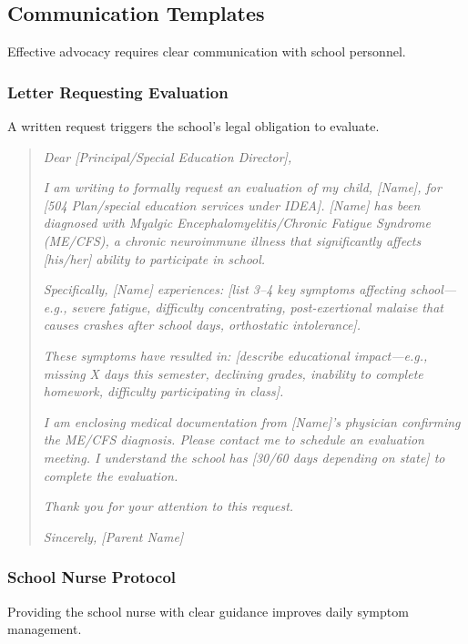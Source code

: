 \subsection{Communication Templates}
\label{subsec:school-communication}

Effective advocacy requires clear communication with school personnel.

\subsubsection{Letter Requesting Evaluation}

A written request triggers the school's legal obligation to evaluate.

\begin{quote}
\textit{Dear [Principal/Special Education Director],}

\textit{I am writing to formally request an evaluation of my child, [Name], for [504 Plan/special education services under IDEA]. [Name] has been diagnosed with Myalgic Encephalomyelitis/Chronic Fatigue Syndrome (ME/CFS), a chronic neuroimmune illness that significantly affects [his/her] ability to participate in school.}

\textit{Specifically, [Name] experiences: [list 3--4 key symptoms affecting school---e.g., severe fatigue, difficulty concentrating, post-exertional malaise that causes crashes after school days, orthostatic intolerance].}

\textit{These symptoms have resulted in: [describe educational impact---e.g., missing X days this semester, declining grades, inability to complete homework, difficulty participating in class].}

\textit{I am enclosing medical documentation from [Name]'s physician confirming the ME/CFS diagnosis. Please contact me to schedule an evaluation meeting. I understand the school has [30/60 days depending on state] to complete the evaluation.}

\textit{Thank you for your attention to this request.}

\textit{Sincerely, [Parent Name]}
\end{quote}

\subsubsection{School Nurse Protocol}

Providing the school nurse with clear guidance improves daily symptom management.

